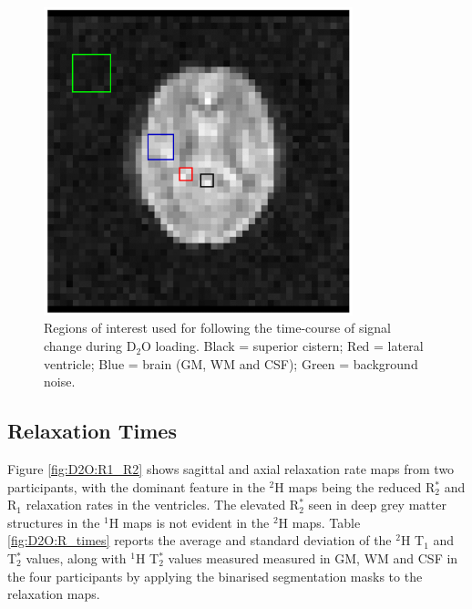 \documentclass[class=article, crop=false]{standalone}
\begin{document}
\begin{figure}[H]
    \centering
    \includegraphics[width=0.8\textwidth]{Figures/D2O/ROI.png}
    \caption{Regions of interest used for following the time-course of signal change during D$_2$O loading. Black = superior cistern; Red = lateral ventricle; Blue = brain (GM, WM and CSF); Green = background noise.}
    \label{fig:D2O:ROI}
\end{figure}

\subsection{Relaxation Times}

Figure \ref{fig:D2O:R1_R2} shows sagittal and axial relaxation rate maps from two participants, with the dominant feature in the $^2$H maps being the reduced R$_2^*$ and R$_1$ relaxation rates in the ventricles. The elevated R$_2^*$ seen in deep grey matter structures in the $^1$H maps is not evident in the $^2$H maps. Table \ref{fig:D2O:R_times} reports the average and standard deviation of the $^2$H T$_1$ and T$_2^*$ values, along with $^1$H T$_2^*$ values measured measured in GM, WM and CSF in the four participants by applying the binarised segmentation masks to the relaxation maps.
\end{document}
